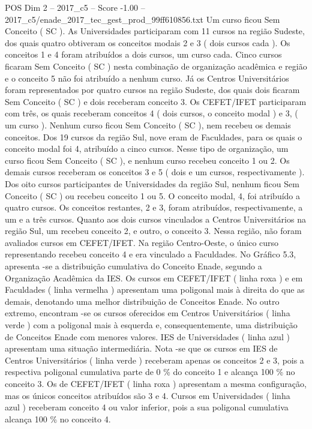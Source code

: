 \begin{textsample}{POS Dim 2 – 2017\_c5 – Score -1.00 – 2017\_c5/enade\_2017\_tec\_gest\_prod\_99ff610856.txt}
Um curso ficou Sem Conceito ( SC ).
As Universidades participaram com 11 cursos na região Sudeste, dos quais quatro obtiveram os conceitos modais 2 e 3 ( dois cursos cada ).
Os conceitos 1 e 4 foram atribuídos a dois cursos, um curso cada.
Cinco cursos ficaram Sem Conceito ( SC ) nesta combinação de organização acadêmica e região e o conceito 5 não foi atribuído a nenhum curso.
Já os Centros Universitários foram representados por quatro cursos na região Sudeste, dos quais dois ficaram Sem Conceito ( SC ) e dois receberam conceito 3.
Os CEFET/IFET participaram com três, os quais receberam conceitos 4 ( dois cursos, o conceito modal ) e 3, ( um curso ).
Nenhum curso ficou Sem Conceito ( SC ), nem recebeu os demais conceitos.
Dos 19 cursos da região Sul, nove eram de Faculdades, para os quais o conceito modal foi 4, atribuído a cinco cursos.
Nesse tipo de organização, um curso ficou Sem Conceito ( SC ), e nenhum curso recebeu conceito 1 ou 2.
Os demais cursos receberam os conceitos 3 e 5 ( dois e um cursos, respectivamente ).
Dos oito cursos participantes de Universidades da região Sul, nenhum ficou Sem Conceito ( SC ) ou recebeu conceito 1 ou 5.
O conceito modal, 4, foi atribuído a quatro cursos.
Os conceitos restantes, 2 e 3, foram atribuídos, respectivamente, a um e a três cursos.
Quanto aos dois cursos vinculados a Centros Universitários na região Sul, um recebeu conceito 2, e outro, o conceito 3.
Nessa região, não foram avaliados cursos em CEFET/IFET.
Na região Centro-Oeste, o único curso representando recebeu conceito 4 e era vinculado a Faculdades.
No Gráfico 5.3, apresenta -se a distribuição cumulativa do Conceito Enade, segundo a Organização Acadêmica da IES.
Os cursos em CEFET/IFET ( linha roxa ) e em Faculdades ( linha vermelha ) apresentam uma poligonal mais à direita do que as demais, denotando uma melhor distribuição de Conceitos Enade.
No outro extremo, encontram -se os cursos oferecidos em Centros Universitários ( linha verde ) com a poligonal mais à esquerda e, consequentemente, uma distribuição de Conceitos Enade com menores valores.
IES de Universidades ( linha azul ) apresentam uma situação intermediária.
Nota -se que os cursos em IES de Centros Universitários ( linha verde ) receberam apenas os conceitos 2 e 3, pois a respectiva poligonal cumulativa parte de 0 \% do conceito 1 e alcança 100 \% no conceito 3.
Os de CEFET/IFET ( linha roxa ) apresentam a mesma configuração, mas os únicos conceitos atribuídos são 3 e 4.
Cursos em Universidades ( linha azul ) receberam conceito 4 ou valor inferior, pois a sua poligonal cumulativa alcança 100 \% no conceito 4.

\end{textsample}
